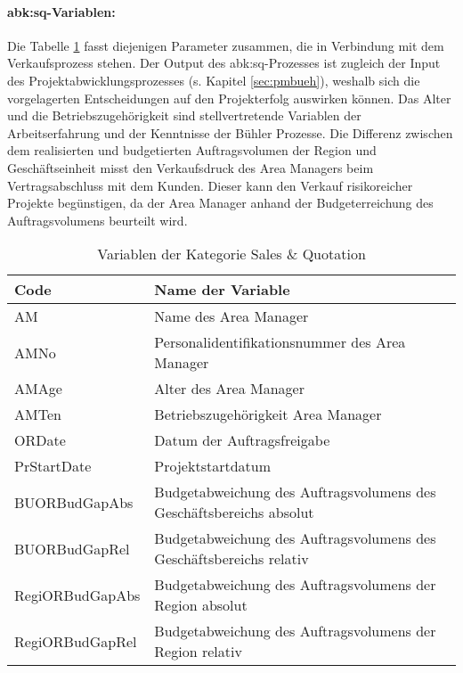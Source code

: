 \paragraph{\gls{abk:sq}-Variablen:} Die Tabelle \ref{tab:sqvar} fasst diejenigen Parameter zusammen, die in Verbindung mit dem Verkaufsprozess stehen. Der Output des \gls{abk:sq}-Prozesses ist zugleich der Input des Projektabwicklungsprozesses (s. Kapitel \ref{sec:pmbueh}), weshalb sich die vorgelagerten Entscheidungen auf den Projekterfolg auswirken können. Das Alter und die Betriebszugehörigkeit sind stellvertretende Variablen der Arbeitserfahrung und der Kenntnisse der Bühler Prozesse. Die Differenz zwischen dem realisierten und budgetierten Auftragsvolumen der Region und Geschäftseinheit misst den Verkaufsdruck des Area Managers beim Vertragsabschluss mit dem Kunden. Dieser kann den Verkauf risikoreicher Projekte begünstigen, da der Area Manager anhand der Budgeterreichung des Auftragsvolumens beurteilt wird.
\begin{table}[H]
	\centering
	\caption{Variablen der Kategorie Sales \& Quotation}
	\begin{tabular}{ll}
		\toprule
		\textbf{Code} & \textbf{Name der Variable} \\
		\midrule
		AM    & Name des Area Manager \\
		AMNo  & Personalidentifikationsnummer des Area Manager  \\
		AMAge & Alter des Area Manager  \\
		AMTen & Betriebszugehörigkeit Area Manager  \\
		ORDate & Datum der Auftragsfreigabe \\
		PrStartDate & Projektstartdatum \\
		BUORBudGapAbs & Budgetabweichung des Auftragsvolumens des Geschäftsbereichs absolut \\
		BUORBudGapRel & Budgetabweichung des Auftragsvolumens des Geschäftsbereichs relativ \\
		RegiORBudGapAbs & Budgetabweichung des Auftragsvolumens der Region absolut \\
		RegiORBudGapRel & Budgetabweichung des Auftragsvolumens der Region relativ \\
		\bottomrule
	\end{tabular}%
	\label{tab:sqvar}%
\end{table}%


